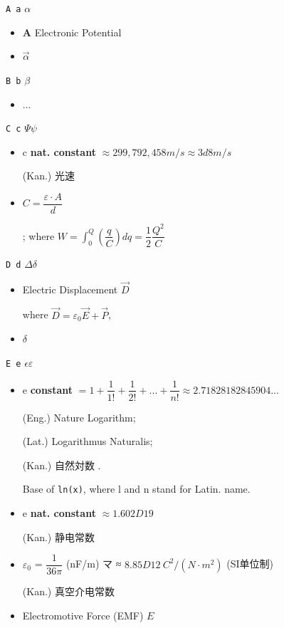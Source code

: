 \texttt{A a} $\alpha$\begin{itemize}

\item $\mathbf{A}$ Electronic Potential

\item $\vec{\alpha}$ 

\end{itemize}

\texttt{B b} $\beta$\begin{itemize}

\item ...

\end{itemize}

\texttt{C c} $\Psi \psi$\begin{itemize}

\item c \textbf{nat. constant} $\approx 299,792,458 m/s \approx 3d8 m/s$

(Kan.) 光速

\item $C = \dfrac{\varepsilon·A}{d}$

; where $W = \int_0^Q(\dfrac{q}{C})dq = \dfrac{1}{2} \dfrac{Q^2}{C}$

\end{itemize}

\texttt{D d} $\Delta \delta$\begin{itemize}

\item Electric Displacement $\vec{D}$

where  $\vec{D}=\varepsilon_0 \vec{E} + \vec{P}$, 

\item $\delta$

\end{itemize}

\texttt{E e} $\epsilon \varepsilon$\begin{itemize}

\item e \textbf{constant} $= 1 + \dfrac{1}{1!} + \dfrac{1}{2!} + ... + \dfrac{1}{n!} \approx 2.71828182845904...$

(Eng.) Nature Logarithm; 

(Lat.) Logarithmus Naturalis; 

(Kan.) 自然対数 .

Base of \verb|ln(x)|, where l and n stand for Latin. name.

\item e \textbf{nat. constant} $\approx 1.602D19$

(Kan.) 静电常数 

\item $\varepsilon_0$ = $\dfrac{1}{36\pi}$ (nF/m) マ ≈ $8.85D12 \ C^2/(N \cdot m^2)$ (SI单位制)

(Kan.) 真空介电常数 

\item Electromotive Force (EMF) $E$

\end{itemize}

